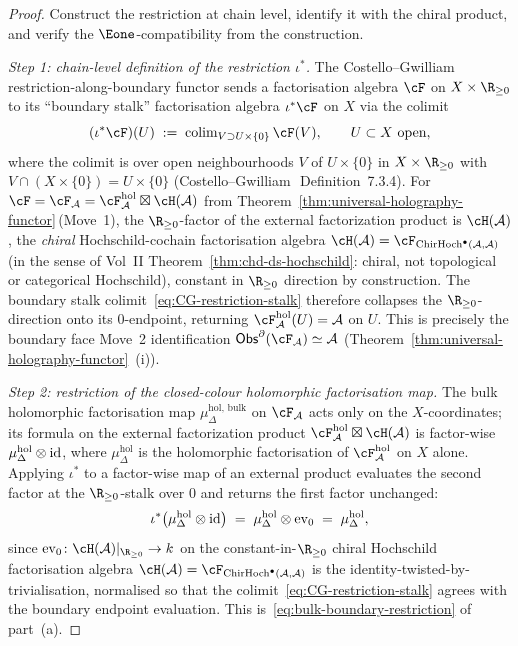 \begin{proof}
Construct the restriction at chain level, identify it with the
chiral product, and verify the $\Eone$-compatibility from the
construction.

\emph{Step 1: chain-level definition of the restriction
$\iota^*$.}
The Costello--Gwilliam restriction-along-boundary functor sends a
factorisation algebra $\cF$ on $X \times \R_{\geq 0}$ to its
``boundary stalk'' factorisation algebra $\iota^*\cF$ on $X$ via
the colimit
\begin{equation}\label{eq:CG-restriction-stalk}
 (\iota^*\cF)(U)
 \;:=\;
 \mathrm{colim}_{V \supset U \times \{0\}}\,\cF(V),
 \qquad U \subset X \text{ open},
\end{equation}
where the colimit is over open neighbourhoods $V$ of
$U \times \{0\}$ in $X \times \R_{\geq 0}$ with $V \cap
(X \times \{0\}) = U \times \{0\}$
(Costello--Gwilliam~\cite{CG21}\,Definition~7.3.4). For
$\cF = \cF_\cA = \cF_\cA^{\mathrm{hol}} \boxtimes \cH(\cA)$ from
Theorem~\ref{thm:universal-holography-functor}\,(Move~1), the
$\R_{\geq 0}$-factor of the external factorization product is
$\cH(\cA)$, the \emph{chiral} Hochschild-cochain factorisation algebra
$\cH(\cA) = \cF_{\ChirHoch^\bullet(\cA, \cA)}$
(in the sense of Vol~II Theorem~\ref{thm:chd-ds-hochschild}: chiral,
not topological or categorical Hochschild),
constant in $\R_{\geq 0}$ direction by construction. The
boundary stalk colimit~\eqref{eq:CG-restriction-stalk} therefore
collapses the $\R_{\geq 0}$-direction onto its $0$-endpoint,
returning $\cF_\cA^{\mathrm{hol}}(U) = \cA$ on $U$. This is precisely
the boundary face Move~2 identification
$\Obs^\partial(\cF_\cA) \simeq \cA$
(Theorem~\ref{thm:universal-holography-functor}~(i)).

\emph{Step 2: restriction of the closed-colour holomorphic
factorisation map.}
The bulk holomorphic factorisation map
$\mu^{\mathrm{hol},\,\mathrm{bulk}}_\Delta$ on $\cF_\cA$ acts only
on the $X$-coordinates; its formula on the external factorization
product $\cF_\cA^{\mathrm{hol}} \boxtimes \cH(\cA)$ is
factor-wise $\mu^{\mathrm{hol}}_\Delta \otimes \mathrm{id}$, where
$\mu^{\mathrm{hol}}_\Delta$ is the holomorphic factorisation of
$\cF_\cA^{\mathrm{hol}}$ on $X$ alone. Applying $\iota^*$ to a
factor-wise map of an external product evaluates the second factor
at the $\R_{\geq 0}$-stalk over $0$ and returns the first factor
unchanged:
\begin{equation}\label{eq:iota-pullback-external}
 \iota^*\bigl(\mu^{\mathrm{hol}}_\Delta \otimes \mathrm{id}\bigr)
 \;=\;
 \mu^{\mathrm{hol}}_\Delta \otimes \mathrm{ev}_0
 \;=\;
 \mu^{\mathrm{hol}}_\Delta,
\end{equation}
since $\mathrm{ev}_0 \colon \cH(\cA)|_{\R_{\geq 0}} \to k$ on the
constant-in-$\R_{\geq 0}$ chiral Hochschild factorisation algebra
$\cH(\cA) = \cF_{\ChirHoch^\bullet(\cA,\cA)}$ is the
identity-twisted-by-trivialisation, normalised so that the
colimit~\eqref{eq:CG-restriction-stalk} agrees with the boundary
endpoint evaluation. This is~\eqref{eq:bulk-boundary-restriction}
of part~(a).


\end{proof}
